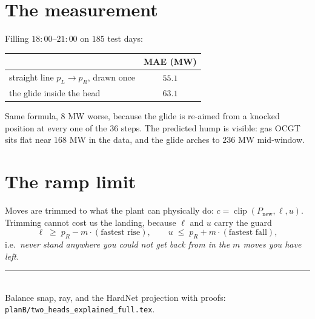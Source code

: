 \documentclass[11pt]{article}
\begin{document}
\section{The measurement}

Filling $18{:}00$--$21{:}00$ on $185$ test days:

\begin{center}
\begin{tabular}{lc}
\toprule
 & MAE (MW) \\
\midrule
straight line $p_L \to p_R$, drawn once & $55.1$ \\
the glide inside the head & $63.1$ \\
\bottomrule
\end{tabular}
\end{center}

Same formula, $8$ MW worse, because the glide is re-aimed from a knocked
position at every one of the $36$ steps. The predicted hump is visible: gas OCGT
sits flat near $168$ MW in the data, and the glide arches to $236$ MW mid-window.

\section{The ramp limit}

Moves are trimmed to what the plant can physically do:
$c = \operatorname{clip}(P_{\text{new}}, \ell, u)$. Trimming cannot cost us the
landing, because $\ell$ and $u$ carry the guard
\[
\ell \;\ge\; p_R - m\cdot(\text{fastest rise}),
\qquad
u \;\le\; p_R + m\cdot(\text{fastest fall}),
\]
i.e.\ \emph{never stand anywhere you could not get back from in the $m$ moves you
have left.}

\vspace{1em}
\noindent\rule{\linewidth}{0.4pt}\\[4pt]
\footnotesize Balance snap, ray, and the HardNet projection with proofs:
\texttt{planB/two\_heads\_explained\_full.tex}.
\end{document}
